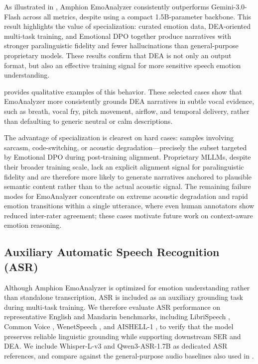 As illustrated in , Amphion EmoAnalyzer consistently outperforms Gemini-3.0-Flash across all metrics, despite using a compact 1.5B-parameter backbone. This result highlights the value of specialization: curated emotion data, DEA-oriented multi-task training, and Emotional DPO together produce narratives with stronger paralinguistic fidelity and fewer hallucinations than general-purpose proprietary models. These results confirm that DEA is not only an output format, but also an effective training signal for more sensitive speech emotion understanding.



 provides qualitative examples of this behavior. These selected cases show that EmoAnalyzer more consistently grounds DEA narratives in subtle vocal evidence, such as breath, vocal fry, pitch movement, airflow, and temporal delivery, rather than defaulting to generic neutral or calm descriptions.

The advantage of specialization is clearest on hard cases: samples involving sarcasm, code-switching, or acoustic degradation---precisely the subset targeted by Emotional DPO during post-training alignment. Proprietary MLLMs, despite their broader training scale, lack an explicit alignment signal for paralinguistic fidelity and are therefore more likely to generate narratives anchored to plausible semantic content rather than to the actual acoustic signal. The remaining failure modes for EmoAnalyzer concentrate on extreme acoustic degradation and rapid emotion transitions within a single utterance, where even human annotators show reduced inter-rater agreement; these cases motivate future work on context-aware emotion reasoning.


\subsection{Auxiliary Automatic Speech Recognition (ASR)}

Although Amphion EmoAnalyzer is optimized for emotion understanding rather than standalone transcription, ASR is included as an auxiliary grounding task during multi-task training. We therefore evaluate ASR performance on representative English and Mandarin benchmarks, including LibriSpeech \cite{LibriSpeech}, Common Voice \cite{CommonVoice}, WenetSpeech \cite{WenetSpeech}, and AISHELL-1 \cite{AIShell}, to verify that the model preserves reliable linguistic grounding while supporting downstream SER and DEA. We include Whisper-L-v3 \cite{Whisper} and Qwen3-ASR-1.7B \cite{Qwen3-ASR} as dedicated ASR references, and compare against the general-purpose audio baselines also used in .

